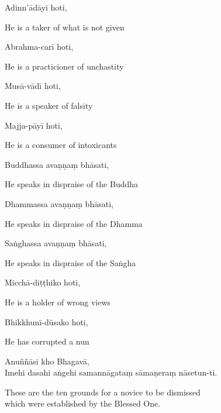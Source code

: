 Adinn'ādāyī hoti,

\begin{english}
  He is a taker of what is not given
\end{english}

Abrahma-carī hoti,

\begin{english}
  He is a practicioner of unchastity
\end{english}

Musā-vādī hoti,

\begin{english}
  He is a speaker of falsity
\end{english}

Majja-pāyī hoti,

\begin{english}
  He is a consumer of intoxicants
\end{english}

Buddhassa avaṇṇaṃ bhāsati,

\begin{english}
  He speaks in dispraise of the Buddha
\end{english}

Dhammassa avaṇṇaṃ bhāsati,

\begin{english}
  He speaks in dispraise of the Dhamma
\end{english}

Saṅghassa avaṇṇaṃ bhāsati,

\begin{english}
  He speaks in dispraise of the Saṅgha
\end{english}

Micchā-diṭṭhiko hoti,

\begin{english}
  He is a holder of wrong views
\end{english}

Bhikkhunī-dūsako hoti,

\begin{english}
  He has corrupted a nun
\end{english}

Anuññāsi kho Bhagavā,\\
Imehi dasahi aṅgehi samannāgataṃ sāmaṇeraṃ nāsetun-ti.

\begin{english}
  These are the ten grounds for a novice to be dismissed\\
  which were established by the Blessed One.
\end{english}

